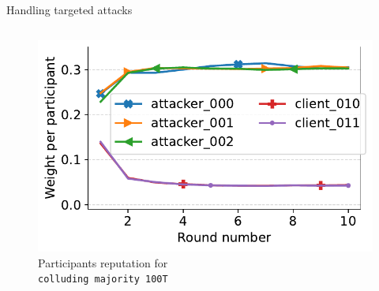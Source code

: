 \begin{frame}{Handling targeted attacks}
\begin{columns}
\begin{column}{.6\textwidth}
\begin{minipage}[t][0.35\textheight]{\textwidth}
        \end{minipage}
    \begin{minipage}[t][0.65\textheight]{\textwidth}
        \begin{figure}
            \captionsetup{justification=centering}
                \includegraphics[width=0.65\linewidth]{./figures/eval/reput/byzantine_majority_loud_expanded.pdf}
                \caption*{Participants reputation for\\
                \texttt{colluding majority 100T}}
      \end{figure}
    \end{minipage}  
         \end{column}
  \end{columns}
\end{frame}